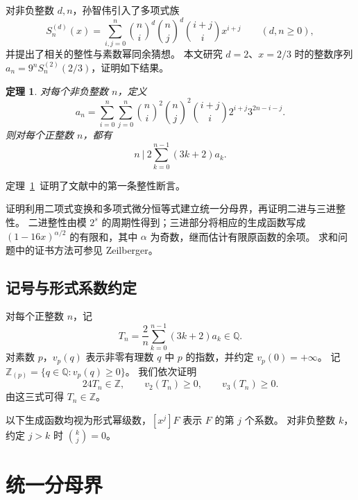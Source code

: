 \documentclass[a4paper,11pt]{article}
\numberwithin{equation}{section}
\theoremstyle{chinese}
\newtheorem{theorem}{定理}
\newcommand{\Z}{\mathbb Z}
\newcommand{\Q}{\mathbb Q}
\begin{document}
对非负整数 $d,n$，孙智伟\cite{Sun2026}引入了多项式族
\begin{equation}\label{eq:Sun-polynomial}
S_n^{(d)}(x)=\sum_{i,j=0}^n\binom ni^d\binom nj^d\binom{i+j}{i}x^{i+j}
\qquad(d,n\ge0),
\end{equation}
并提出了相关的整性与素数幂同余猜想。
本文研究 $d=2$、$x=2/3$ 时的整数序列
$a_n=9^nS_n^{(2)}(2/3)$，证明如下结果。
\begin{theorem}\label{thm:main}
对每个非负整数 $n$，定义
\begin{equation}\label{eq:sequence}
a_n=\sum_{i=0}^{n}\sum_{j=0}^{n}
\binom ni^2\binom nj^2\binom{i+j}{i}
2^{i+j}3^{2n-i-j}.
\end{equation}
则对每个正整数 $n$，都有
\begin{equation}\label{eq:goal}
n\ \bigg|\ 2\sum_{k=0}^{n-1}(3k+2)a_k.
\end{equation}
\end{theorem}

定理~\ref{thm:main}~证明了文献\cite[Conjecture 4.3(ii)]{Sun2026}中的第一条整性断言。

证明利用二项式变换和多项式微分恒等式建立统一分母界，再证明二进与三进整性。
二进整性由模 $2^s$ 的周期性得到；三进部分将相应的生成函数写成
$(1-16x)^{\alpha/2}$ 的有限和，其中 $\alpha$ 为奇数，继而估计有限原函数的余项。
求和问题中的证书方法可参见 Zeilberger\cite{Zeilberger1991}。

\subsection*{记号与形式系数约定}
对每个正整数 $n$，记
\begin{equation}\label{eq:T}
T_n=\frac2n\sum_{k=0}^{n-1}(3k+2)a_k\in\Q.
\end{equation}
对素数 $p$，$v_p(q)$ 表示非零有理数 $q$ 中 $p$ 的指数，并约定 $v_p(0)=+\infty$。
记 $\Z_{(p)}=\{q\in\Q:v_p(q)\ge0\}$。
我们依次证明
\begin{equation}\label{eq:threeclaims}
24T_n\in\Z,\qquad v_2(T_n)\ge0,\qquad v_3(T_n)\ge0.
\end{equation}
由这三式可得 $T_n\in\Z$。

以下生成函数均视为形式幂级数，$[x^j]F$ 表示 $F$ 的第 $j$ 个系数。
对非负整数 $k$，约定 $j>k$ 时 $\binom{k}{j}=0$。

\section{统一分母界}
\end{document}
